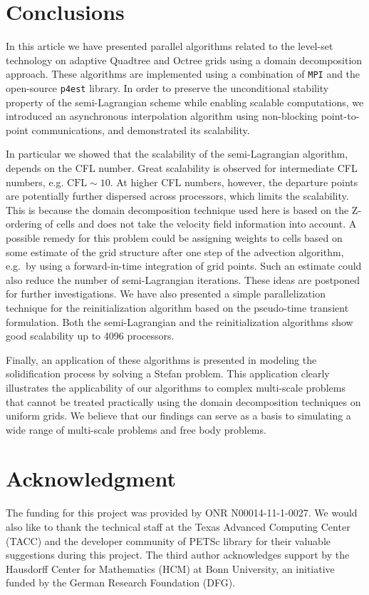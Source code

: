 \section{Conclusions}
In this article we have presented parallel algorithms related to the level-set technology on adaptive Quadtree and Octree grids using a domain decomposition approach. These algorithms are implemented using a combination of \texttt{MPI} and the open-source \texttt{p4est} library. In order to preserve the unconditional stability property of the semi-Lagrangian scheme while enabling scalable computations, we introduced an asynchronous interpolation algorithm using non-blocking point-to-point communications, and demonstrated its scalability. 

In particular we showed that the scalability of the semi-Lagrangian algorithm, depends on the CFL number. Great scalability is observed for intermediate CFL numbers, e.g. $\text{CFL}\sim10$. At higher CFL numbers, however, the departure points are potentially further dispersed across processors, which limits the scalability. This is because the domain decomposition technique used here is based on the Z-ordering of cells and does not take the velocity field information into account. A possible remedy for this problem could be assigning weights to cells based on some estimate of the grid structure after one step of the advection algorithm, e.g.\ by using a forward-in-time integration of grid points. Such an estimate could also reduce the number of semi-Lagrangian iterations. These ideas are postponed for further investigations. We have also presented a simple parallelization technique for the reinitialization algorithm based on the pseudo-time transient formulation. Both the semi-Lagrangian and the reinitialization algorithms show good scalability up to 4096 processors. 

Finally, an application of these algorithms is presented in modeling the solidification process by solving a Stefan problem. This application clearly illustrates the applicability of our algorithms to complex multi-scale problems that cannot be treated practically using the domain decomposition techniques on uniform grids. We believe that our findings can serve as a basis to simulating a wide range of multi-scale problems and free body problems.

\section*{Acknowledgment} 
The funding for this project was provided by ONR N00014-11-1-0027.
We would also like to thank the technical staff at the Texas Advanced Computing
Center (TACC) and the developer community of PETSc library for their valuable
suggestions during this project.
The third author acknowledges support by the Hausdorff Center for Mathematics
(HCM) at Bonn University,
an initiative funded by the German Research Foundation (DFG).
